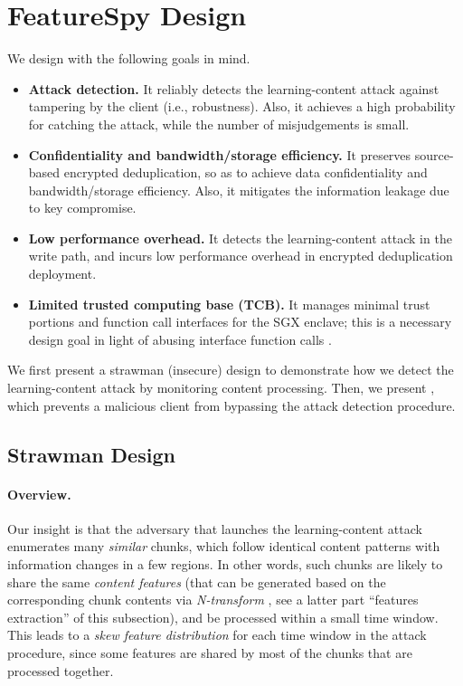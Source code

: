 \section{FeatureSpy Design}
\label{sec:design}

We design \sysnameF with the following goals in mind.

\begin{itemize}[leftmargin=*]

\item {\bf Attack detection.} It reliably detects the learning-content attack against tampering by the client (i.e., robustness). Also, it achieves a high probability for catching the attack, while the number of misjudgements is small.
\item {\bf Confidentiality and bandwidth/storage efficiency.} It preserves source-based encrypted deduplication, so as to achieve  data confidentiality and bandwidth/storage efficiency. Also, it mitigates the information leakage due to key compromise.
\item {\bf Low performance overhead.} It detects the learning-content attack in the write path, and incurs low performance overhead in encrypted deduplication deployment.
\item {\bf Limited trusted computing base (TCB).} It manages minimal trust portions and function call interfaces for the SGX enclave; this is a necessary design goal in light of abusing interface function calls \cite{lie05}.
\end{itemize}

We first present a strawman (insecure) design to demonstrate how we detect the learning-content attack by monitoring  content processing. Then, we present \sysnameF, which prevents a malicious client from bypassing the attack detection procedure.



\subsection{Strawman Design}
\label{sub:basic}

\paragraph{Overview.} Our insight is that the adversary that launches the learning-content attack enumerates many {\em similar} chunks, which follow identical content patterns with information changes in a few  regions. In other words, such chunks are likely to share the same {\em content features} (that can be generated based on the corresponding chunk contents via {\em N-transform} \cite{shilane12}, see a latter part ``features extraction'' of this subsection), and be  processed within a small time window. This leads to a {\em skew feature distribution} for each time window in the attack procedure, since some features are shared by most of the chunks that are processed together.

